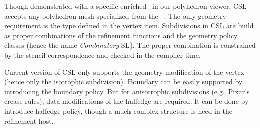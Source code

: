 Though demonstrated with a specific enriched \poly\ in our 
polyhedron viewer, CSL accepts any polyhedron mesh specialized 
from the \poly\ . The only geometry requirement is the  type 
defined in the vertex item.  
Subdivisions in CSL are build as proper combinations of the
refinement functions and the geometry policy classes (hence the
name \emph{Combinatory} SL). The proper combination is constrained 
by the stencil correspondence and checked in the compiler time.

Current version of CSL only supports the geometry modification 
of the vertex (hence only the isotrophic subdivision). Boundary
can be easily supported by introducing the boundary policy. But
for anisotrophic subdivisions (e.g.\ Pixar's crease rules), data
modifications of the halfedge are required. It can be done by 
introduce halfedge policy, though a much complex structure
is need in the refinement host.

